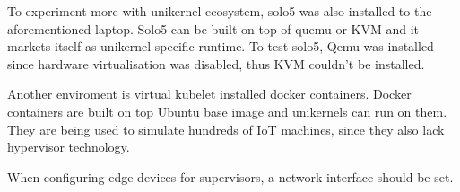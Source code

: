To experiment more with unikernel ecosystem, solo5 was also installed to the aforementioned laptop. Solo5 can be built on top of quemu or KVM and it markets itself as unikernel specific runtime. To test solo5, Qemu was installed since hardware virtualisation was disabled, thus KVM couldn't be installed.

Another enviroment is virtual kubelet installed docker containers. Docker containers are built on top Ubuntu base image and unikernels can run on them. They are being used to simulate hundreds of IoT machines, since they also lack hypervisor technology.

When configuring edge devices for supervisors, a network interface should be set.
